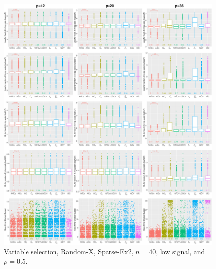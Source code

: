 \begin{figure}[!ht]
\centering
\includegraphics[width=\textwidth]{figures/supplement/randomx/subset_selection/Sparse-Ex2_n40_lsnr_rho05.eps}
\caption{Variable selection, Random-X, Sparse-Ex2, $n=40$, low signal, and $\rho=0.5$.}
\end{figure}
\clearpage
